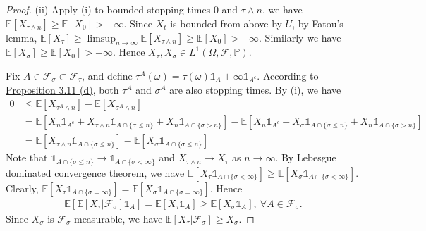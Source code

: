 \documentclass{article}
\numberwithin{equation}{section}
\newcommand{\E}{\mathbb{E}}
\renewcommand{\P}{\mathbb{P}}
\theoremstyle{plain}
\theoremstyle{definition}
\begin{document}
\begin{proof}
(ii) Apply (i) to bounded stopping times $0$ and $\tau\wedge n$, we have $\E[X_{\tau\wedge n}]\geq\E[X_0]>-\infty$. Since $X_t$ is bounded from above by $U$, by Fatou's lemma, $\E[X_\tau]\geq\limsup_{n\to\infty}\E[X_{\tau\wedge n}]\geq \E[X_0]>-\infty$. Similarly we have $\E[X_\sigma]\geq \E[X_0] >-\infty$. Hence $X_\tau,X_\sigma\in L^1(\Omega,\mathscr{F},\P)$.

Fix $A\in\mathscr{F}_\sigma\subset\mathscr{F}_\tau$, and define $\tau^A(\omega)=\tau(\omega)\mathds{1}_A + \infty\mathds{1}_{A^c}$. According to \hyperref[prop:3.11]{Proposition 3.11 (d)}, both $\tau^A$ and $\sigma^A$ are also stopping times. By (i), we have
\begin{align*}
	0 &\leq \E\left[X_{\tau^A\wedge n}\right]-\E\left[X_{\sigma^A\wedge n}\right]\\
	&=\E\left[X_n\mathds{1}_{A^c}+X_{\tau\wedge n}\mathds{1}_{A\cap\{\sigma\leq n\}}+X_n\mathds{1}_{A\cap\{\sigma>n\}}\right]-\E\left[X_n\mathds{1}_{A^c}+X_\sigma\mathds{1}_{A\cap\{\sigma\leq n\}}+X_n\mathds{1}_{A\cap\{\sigma>n\}}\right]\\
	&= \E\left[X_{\tau\wedge n}\mathds{1}_{A\cap\{\sigma\leq n\}}\right] - \E\left[X_{\sigma}\mathds{1}_{A\cap\{\sigma\leq n\}}\right]
\end{align*}
Note that $\mathds{1}_{A\cap\{\sigma\leq n\}}\to\mathds{1}_{A\cap\{\sigma<\infty\}}$ and $X_{\tau\wedge n}\to X_\tau$ as $n\to\infty$. By Lebesgue dominated convergence theorem, we have $\E[X_\tau\mathds{1}_{A\cap\{\sigma<\infty\}}]\geq\E[X_\sigma\mathds{1}_{A\cap\{\sigma<\infty\}}]$. Clearly, $\E[X_\tau\mathds{1}_{A\cap\{\sigma=\infty\}}]=\E[X_\sigma\mathds{1}_{A\cap\{\sigma=\infty\}}]$. Hence
\begin{align*}
	\E[\E[X_\tau|\mathscr{F}_\sigma]\mathds{1}_A]=\E[X_\tau\mathds{1}_A]\geq\E[X_\sigma\mathds{1}_A],\ \forall A\in\mathscr{F}_\sigma.
\end{align*}
Since $X_\sigma$ is $\mathscr{F}_\sigma$-measurable, we have $\E[X_\tau|\mathscr{F}_\sigma]\geq X_\sigma$.
\end{proof}
\end{document}
